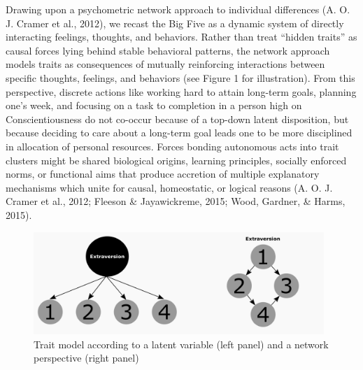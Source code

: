 \documentclass[man]{apa6}
\begin{document}
Drawing upon a psychometric network approach to individual differences
(A. O. J. Cramer et al., 2012), we recast the Big Five as a dynamic
system of directly interacting feelings, thoughts, and behaviors. Rather
than treat \enquote{hidden traits} as causal forces lying behind stable
behavioral patterns, the network approach models traits as consequences
of mutually reinforcing interactions between specific thoughts,
feelings, and behaviors (see Figure 1 for illustration). From this
perspective, discrete actions like working hard to attain long-term
goals, planning one's week, and focusing on a task to completion in a
person high on Conscientiousness do not co-occur because of a top-down
latent disposition, but because deciding to care about a long-term goal
leads one to be more disciplined in allocation of personal resources.
Forces bonding autonomous acts into trait clusters might be shared
biological origins, learning principles, socially enforced norms, or
functional aims that produce accretion of multiple explanatory
mechanisms which unite for causal, homeostatic, or logical reasons (A.
O. J. Cramer et al., 2012; Fleeson \& Jayawickreme, 2015; Wood, Gardner,
\& Harms, 2015).

\begin{figure}

{\centering \includegraphics[width=4.32in]{Latnet_fig1} 

}

\caption{Trait model according to a latent variable (left panel) and a network perspective (right panel)}\label{fig:unnamed-chunk-2}
\end{figure}
\end{document}

